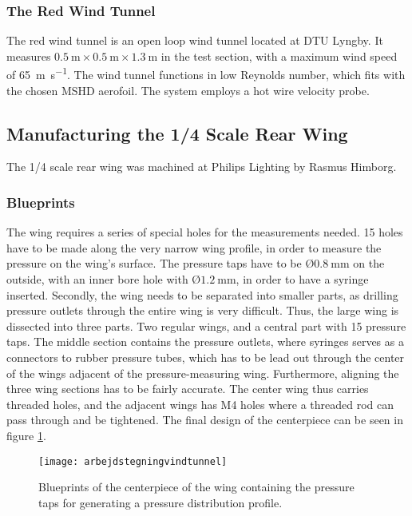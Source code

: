     \subsubsection{The Red Wind Tunnel}

      The red wind tunnel is an open loop wind tunnel located at DTU Lyngby. It measures $\SI{0.5}{\metre} \times \SI{0.5}{\metre} \times \SI{1.3}{\metre}$ in the test section, with a maximum wind speed of \SI{65}{\metre\per\second}. The wind tunnel functions in low Reynolds number, which fits with the chosen MSHD aerofoil. The system employs a hot wire velocity probe.


  \subsection{Manufacturing the 1/4 Scale Rear Wing}

    The 1/4 scale rear wing was machined at Philips Lighting by Rasmus Himborg.

    \subsubsection{Blueprints}

      The wing requires a series of special holes for the measurements needed. 15 holes have to be made along the very narrow wing profile, in order to measure the pressure on the wing's surface. The pressure taps have to be $Ø\SI{0.8}{\milli\metre}$ on the outside, with an inner bore hole with $Ø\SI{1.2}{\milli\metre}$, in order to have a syringe inserted. Secondly, the wing needs to be separated into smaller parts, as drilling pressure outlets through the entire wing is very difficult. Thus, the large wing is dissected into three parts. Two regular wings, and a central part with 15 pressure taps. The middle section contains the pressure outlets, where syringes serves as a connectors to rubber pressure tubes, which has to be lead out through the center of the wings adjacent of the pressure-measuring wing. Furthermore, aligning the three wing sections has to be fairly accurate. The center wing thus carries threaded holes, and the adjacent wings has M4 holes where a threaded rod can pass through and be tightened. The final design of the centerpiece can be seen in figure \ref{fig:scalewingblueprint}.

      \begin{figure}
        \texttt{[image: arbejdstegningvindtunnel]}
        \caption{Blueprints of the centerpiece of the wing containing the pressure taps for generating a pressure distribution profile.}
        \label{fig:scalewingblueprint}
      \end{figure}

